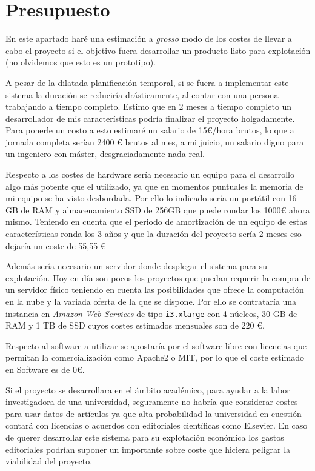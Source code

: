 \section{Presupuesto}

En este apartado haré una estimación a \textit{grosso} modo de los costes de llevar a cabo el proyecto si el objetivo fuera desarrollar un producto listo para explotación (no olvidemos que esto es un prototipo). 

A pesar de la dilatada planificación temporal, si se fuera a implementar este sistema la duración se reduciría drásticamente, al contar con una persona trabajando a tiempo completo. Estimo que en 2 meses a tiempo completo un desarrollador de mis características podría finalizar el proyecto holgadamente. Para ponerle un costo a esto estimaré un salario de 15€/hora brutos, lo que a jornada completa serían 2400 € brutos al mes, a mi juicio, un salario digno para un ingeniero con máster, desgraciadamente nada real. 

Respecto a los costes de hardware sería necesario un equipo para el desarrollo algo más potente que el utilizado, ya que en momentos puntuales la memoria de mi equipo se ha visto desbordada.
Por ello lo indicado sería un portátil con 16 GB de RAM y almacenamiento SSD de 256GB que puede rondar los 1000€ ahora mismo. Teniendo en cuenta que el periodo de amortización de un equipo de estas características ronda los 3 años y que la duración del proyecto sería 2 meses eso dejaría un coste de 55,55 €

Además sería necesario un servidor donde desplegar el sistema para su explotación. Hoy en día son pocos los proyectos que puedan requerir la compra de un servidor físico teniendo en cuenta las posibilidades que ofrece la computación en la nube y la variada oferta de la que se dispone. Por ello se contrataría una instancia en \textit{Amazon Web Services} de tipo \texttt{i3.xlarge} con 4 núcleos, 30 GB de RAM y 1 TB de SSD cuyos costes estimados mensuales son de 220 €.

Respecto al software a utilizar se apostaría por el software libre con licencias que permitan la comercialización como Apache2 o MIT, por lo que el coste estimado en Software es de 0€.

Si el proyecto se desarrollara en el ámbito académico, para ayudar a la labor investigadora de una universidad, seguramente no habría que considerar costes para usar datos de artículos ya que alta probabilidad la universidad en cuestión contará con licencias o acuerdos con editoriales científicas como Elsevier. En caso de querer desarrollar este sistema para su explotación económica los gastos editoriales podrían suponer un importante sobre coste que hiciera peligrar la viabilidad del proyecto.

